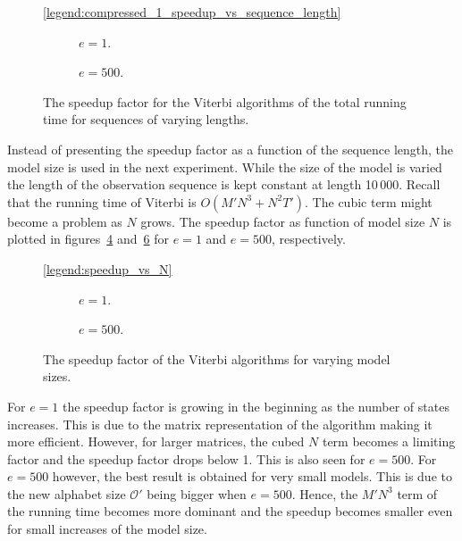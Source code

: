\begin{figure}
  \centering\ref{legend:compressed_1_speedup_vs_sequence_length}\\
  \begin{subfigure}{0.5\textwidth}
    \centering 
    \caption{$e = 1$.}
    \label{fig:compressed_1_speedup_vs_sequence_length}
  \end{subfigure}\hspace{-5mm}%
  \begin{subfigure}{0.5\textwidth}
    \centering 
    \caption{$e = 500$.}
    \label{fig:compressed_500_speedup_vs_sequence_length}
  \end{subfigure}
  \caption{The speedup factor for the Viterbi algorithms of the total running
    time for sequences of varying lengths.}
\end{figure}

Instead of presenting the speedup factor as a function of the sequence length,
the model size is used in the next experiment. While the size of the model
is varied the length of the observation sequence is kept constant at length
10\,000. Recall that the running time of Viterbi is $O(M' N^3 + N^2 T')$. The
cubic term might become a problem as $N$ grows. The speedup factor as function
of model size $N$ is plotted in figures~\ref{fig:speedup_vs_N}
and~\ref{fig:speedup_vs_N2} for $e = 1$ and $e = 500$,
respectively.

\begin{figure}
  \centering\ref{legend:speedup_vs_N}\\
  \begin{subfigure}{0.5\textwidth}
    \centering 
    \caption{$e = 1$.}
    \label{fig:speedup_vs_N}
  \end{subfigure}\hspace{-5mm}%
  \begin{subfigure}{0.5\textwidth}
    \centering 
    \caption{$e=500$.}
    \label{fig:speedup_vs_N2}
  \end{subfigure}
  \caption{The speedup factor of the Viterbi algorithms for varying model
    sizes.}
\end{figure}

For $e = 1$ the speedup factor is growing in the beginning as the number of
states increases. This is due to the matrix representation of the algorithm
making it more efficient. However, for larger matrices, the cubed $N$ term
becomes a limiting factor and the speedup factor drops below 1. This is also
seen for $e = 500$. For $e = 500$ however, the best result is obtained for very
small models. This is due to the new alphabet size $\mathcal{O'}$ being
bigger when $e = 500$. Hence, the $M' N^3$ term of the running time becomes
more dominant and the speedup becomes smaller even for small increases of the
model size.

